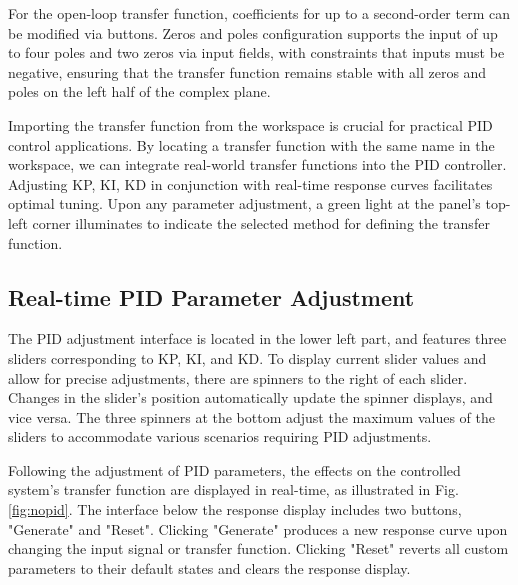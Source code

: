 \documentclass[journal,twoside,web]{ieeecolor}
\begin{document}
For the open-loop transfer function, coefficients for up to a second-order term can be modified via buttons. Zeros and poles configuration supports the input of up to four poles and two zeros via input fields, with constraints that inputs must be negative, ensuring that the transfer function remains stable with all zeros and poles on the left half of the complex plane.

Importing the transfer function from the workspace is crucial for practical PID control applications. By locating a transfer function with the same name in the workspace, we can integrate real-world transfer functions into the PID controller. Adjusting KP, KI, KD in conjunction with real-time response curves facilitates optimal tuning. Upon any parameter adjustment, a green light at the panel's top-left corner illuminates to indicate the selected method for defining the transfer function.

\subsection{Real-time PID Parameter Adjustment}



The PID adjustment interface is located in the lower left part, and features three sliders corresponding to KP, KI, and KD. To display current slider values and allow for precise adjustments, there are spinners to the right of each slider. Changes in the slider's position automatically update the spinner displays, and vice versa. The three spinners at the bottom adjust the maximum values of the sliders to accommodate various scenarios requiring PID adjustments.

Following the adjustment of PID parameters, the effects on the controlled system’s transfer function are displayed in real-time, as illustrated in Fig.\ref{fig:nopid}. The interface below the response display includes two buttons, "Generate" and "Reset". Clicking "Generate" produces a new response curve upon changing the input signal or transfer function. Clicking "Reset" reverts all custom parameters to their default states and clears the response display.
\end{document}
